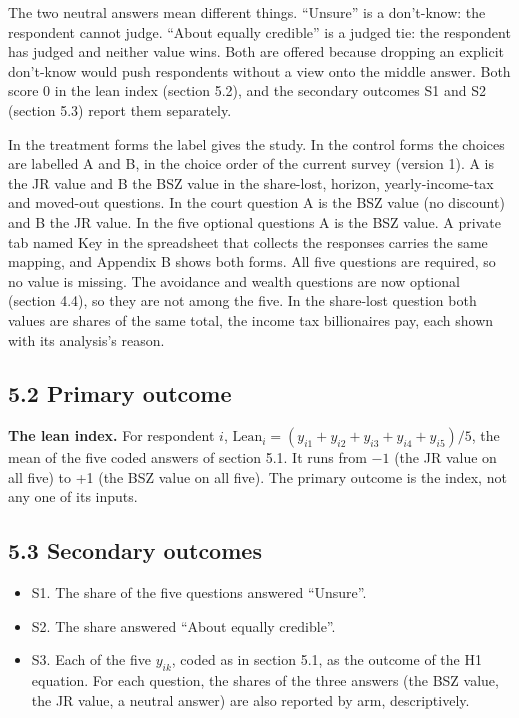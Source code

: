 The two neutral answers mean different things. ``Unsure'' is a don't-know: the respondent cannot
judge. ``About equally credible'' is a judged tie: the respondent has judged and neither value wins.
Both are offered because dropping an explicit don't-know would push respondents without a view
onto the middle answer. Both score 0 in the lean index (section 5.2), and the secondary outcomes S1 and S2 (section
5.3) report them separately.

In the treatment forms the label gives the study. In the control forms the choices are labelled A and B, in
the choice order of the current survey (version 1). A is the JR value and B the BSZ value in the
share-lost, horizon, yearly-income-tax and moved-out questions. In the court question A is the BSZ
value (no discount) and B the JR value. In the five optional questions A is the BSZ value. A
private tab named Key in the spreadsheet that collects the responses carries the same mapping, and
Appendix B shows both forms. All five questions
are required, so no value is missing. The avoidance and wealth questions are now optional (section
4.4), so they are not among the five. In the share-lost question both values are shares of
the same total, the income tax billionaires pay, each shown with its analysis's reason.

\subsection{5.2 Primary outcome}\label{primary-outcome}

\textbf{The lean index.} For respondent \(i\), \(\mathrm{Lean}_i = (y_{i1} + y_{i2} + y_{i3} + y_{i4} + y_{i5}) / 5\), the
mean of the five coded answers of section 5.1. It runs from \(-1\) (the JR value
on all five) to +1 (the BSZ value on all five). The primary outcome is the index, not any one of its
inputs.

\subsection{5.3 Secondary outcomes}\label{secondary-outcomes}

\begin{itemize}
\tightlist
\item
  S1. The share of the five questions answered ``Unsure''.
\item
  S2. The share answered ``About equally credible''.
\item
  S3. Each of the five \(y_{ik}\), coded as in section 5.1, as the outcome of the H1 equation. For
  each question, the shares of the three answers (the BSZ value, the JR value, a neutral answer)
  are also reported by arm, descriptively.
\end{itemize}

